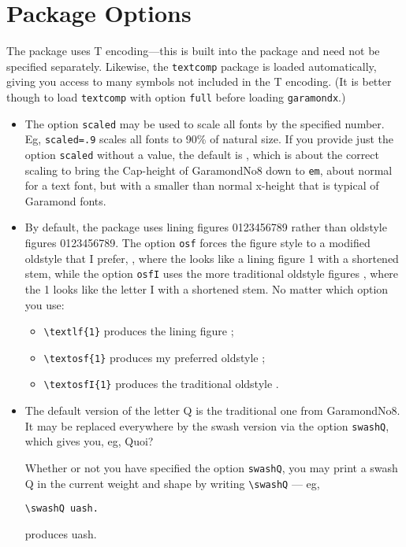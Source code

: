 \documentclass[11pt]{article}
\begin{document}
\section{Package Options}
The package uses T encoding---this is built into the package and need not be specified separately. Likewise, the \texttt{textcomp} package is loaded automatically, giving you access to many symbols not included in the T encoding. (It is better though to load {\tt textcomp} with option {\tt full} before loading {\tt garamondx}.)
\begin{itemize}
\item
The option \texttt{scaled} may be used to scale all fonts by the specified number. Eg, \texttt{scaled=.9} scales all fonts to 90\% of natural size. If you provide just the option \texttt{scaled} without a value, the default is , which is about the correct scaling to bring the Cap-height of GaramondNo8 down to \texttt{em}, about normal for a text font, but with a  smaller than normal  x-height that is typical of Garamond fonts.
\item
By default, the package uses lining figures { 0123456789} rather than oldstyle figures 0123456789. The option \texttt{osf} forces the figure style to a modified oldstyle that I prefer, , where the  looks like a lining figure { 1} with a shortened stem, while the option \texttt{osfI} uses the more traditional oldstyle figures , where the 1 looks like the letter I with a shortened stem. No matter which option you use:
\begin{itemize}
\item
\verb|\textlf{1}| produces the lining figure ;
\item \verb|\textosf{1}| produces my preferred oldstyle ;
\item \verb|\textosfI{1}| produces the traditional oldstyle .
\end{itemize}
\item The default version of the letter Q is the traditional one from GaramondNo8. It may be replaced everywhere by the swash version via the option \texttt{swashQ}, which gives you, eg, 
{\sq Q}uoi?

Whether or not you have specified the option \texttt{swashQ}, you may print a swash Q in the current weight and shape by writing \verb|\swashQ| --- eg, 
\begin{verbatim}
\swashQ uash.
\end{verbatim}
produces \swashQ uash.
\end{itemize}
\end{document}
